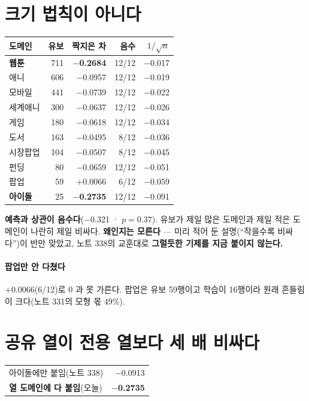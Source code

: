 \documentclass[10pt]{article}
\begin{document}
\section{크기 법칙이 아니다}

\begin{center}\footnotesize
\begin{tabular}{lrrrr}
\hline
도메인 & 유보 & 짝지은 차 & 음수 & $1/\sqrt{n}$ \\
\hline
\textbf{웹툰} & 711 & \textbf{$-$0.2684} & 12/12 & $-$0.017 \\
애니 & 606 & $-$0.0957 & 12/12 & $-$0.019 \\
모바일 & 441 & $-$0.0739 & 12/12 & $-$0.022 \\
세계애니 & 300 & $-$0.0637 & 12/12 & $-$0.026 \\
게임 & 180 & $-$0.0618 & 12/12 & $-$0.034 \\
도서 & 163 & $-$0.0495 & 8/12 & $-$0.036 \\
시장팝업 & 104 & $-$0.0507 & 8/12 & $-$0.045 \\
펀딩 & 80 & $-$0.0659 & 12/12 & $-$0.051 \\
팝업 & 59 & $+$0.0066 & 6/12 & $-$0.059 \\
\textbf{아이돌} & 25 & \textbf{$-$0.2735} & 12/12 & $-$0.091 \\
\hline
\end{tabular}
\end{center}

\textbf{예측과 상관이 음수다}($-$0.321 · $p{=}0.37$). 유보가 제일 많은
도메인과 제일 적은 도메인이 나란히 제일 비싸다. \textbf{왜인지는 모른다}
--- 미리 적어 둔 설명(``작을수록 비싸다'')이 반만 맞았고, 노트 338의
교훈대로 \textbf{그럴듯한 기제를 지금 붙이지 않는다.}

\paragraph{팝업만 안 다쳤다} $+$0.0066(6/12)로 0 과 못 가른다. 팝업은
유보 59행이고 학습이 16행이라 원래 흔들림이 크다(노트 331의 모형 몫 49\%).

\section{공유 열이 전용 열보다 세 배 비싸다}

\begin{center}\small
\begin{tabular}{lr}
\hline
아이돌에만 붙임(노트 338) & $-$0.0913 \\
\textbf{열 도메인에 다 붙임}(오늘) & \textbf{$-$0.2735} \\
\hline
\end{tabular}
\end{center}
\end{document}
